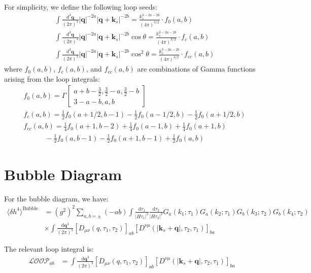 \documentclass[a4paper,12pt]{article}
\def\di{{\mathrm{d}}}
\def\mb{\mathbf}
\def\la{\langle}\def\ra{\rangle}
\begin{document}
For simplicity, we define the following loop seeds:
\begin{align}
    &\int \frac{d^3\mathbf{q}}{(2\pi)^3} |\mathbf{q}|^{-2a} |\mathbf{q} + \mathbf{k}_s|^{-2b} = \frac{k_s^{3-2a-2b}}{(4\pi)^{3/2}} \cdot f_0(a,b) \\
    &\int \frac{d^3\mathbf{q}}{(2\pi)^3} |\mathbf{q}|^{-2a} |\mathbf{q} + \mathbf{k}_s|^{-2b} \cos\theta = \frac{k_s^{3-2a-2b}}{(4\pi)^{3/2}} \cdot f_c(a,b) \\
    &\int \frac{d^3\mathbf{q}}{(2\pi)^3} |\mathbf{q}|^{-2a} |\mathbf{q} + \mathbf{k}_s|^{-2b} \cos^2\theta = \frac{k_s^{3-2a-2b}}{(4\pi)^{3/2}} \cdot f_{cc}(a,b) 
\end{align}
where $f_0(a,b)$, $f_c(a,b)$, and $f_{cc}(a,b)$ are combinations of Gamma functions arising from the loop integrals:
\begin{align}
    &f_0(a,b) = \Gamma \left[\begin{array}{c}
    a+b-\frac{3}{2}, \frac{3}{2}-a, \frac{3}{2}-b \\
    3-a-b, a,b
    \end{array}\right] \\
    &f_c(a,b) = \frac{1}{2}f_0(a+1/2,b-1) - \frac{1}{2}f_0(a-1/2,b) - \frac{1}{2}f_0(a+1/2,b) \\
    &f_{cc}(a,b) = \frac{1}{4}f_0(a+1,b-2) + \frac{1}{4}f_0(a-1,b) + \frac{1}{4}f_0(a+1,b) \nonumber \\
    &\qquad \quad - \frac{1}{2}f_0(a,b-1) -\frac{1}{2}f_0(a+1,b-1) +\frac{1}{2}f_0(a,b)
\end{align}

\section{Bubble Diagram}
For the bubble diagram, we have:
\begin{align}
    \la \delta h^4 \ra^{\text{Bubble}} &= \left( g^2 \right)^2 \sum_{a,b=\pm} (-ab) \int \frac{\di \tau_1}{|H \tau_1|^2} \frac{\di \tau_2}{|H \tau_2|^2} G_a(k_1;\tau_1) G_a(k_2;\tau_1) G_b(k_3;\tau_2) G_b(k_4;\tau_2) \nonumber \\
    &\times \int \frac{\di \mb{q}^3}{(2\pi)^3} \left[ D_{\mu\nu}(q,\tau_1,\tau_2) \right]_{ab} \left[ D^{\nu\mu}(|\mb{k}_s + \mb{q}|,\tau_2,\tau_1) \right]_{ba}
\end{align}

The relevant loop integral is:
\begin{align}
    \mathcal{LOOP}_{ab} &= \int \frac{\di \mb{q}^3}{(2\pi)^3} \left[ D_{\mu\nu}(q,\tau_1,\tau_2) \right]_{ab} \left[ D^{\nu\mu}(|\mb{k}_s + \mb{q}|,\tau_2,\tau_1) \right]_{ba}
\end{align}
\end{document}
